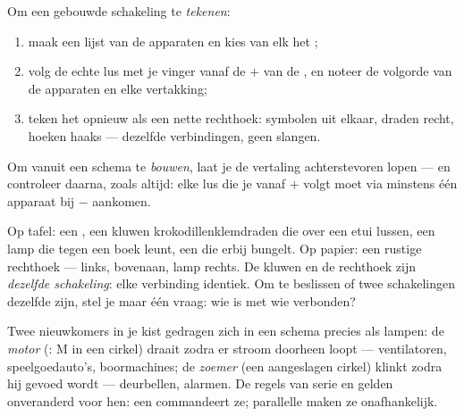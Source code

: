 \begin{method}\label{met:g6:circuits-and-safety:translate}
Om een gebouwde schakeling te \emph{tekenen}:
\begin{enumerate}
  \item maak een lijst van de apparaten en kies van elk het
        ;
  \item volg de echte lus met je vinger vanaf de $+$ van de
        , en noteer de volgorde van de apparaten en elke
        vertakking;
  \item teken het opnieuw als een nette rechthoek: symbolen uit
        elkaar, draden recht, hoeken haaks --- dezelfde
        verbindingen, geen slangen.
\end{enumerate}
Om vanuit een schema te \emph{bouwen}, laat je de vertaling
achterstevoren lopen --- en controleer daarna, zoals altijd: elke lus
die je vanaf $+$ volgt moet via minstens één apparaat bij $-$
aankomen.
\end{method}

\begin{example}\label{ex:g6:circuits-and-safety:portraits}
Op tafel: een , een kluwen krokodillenklemdraden die over
een etui lussen, een lamp die tegen een boek leunt, een 
die erbij bungelt. Op papier: een rustige rechthoek --- 
links,  bovenaan, lamp rechts. De kluwen en de rechthoek
zijn \emph{dezelfde schakeling}: elke verbinding identiek. Om te
beslissen of twee schakelingen dezelfde zijn, stel je maar één vraag:
wie is met wie verbonden?
\end{example}

\begin{example}\label{ex:g6:circuits-and-safety:motor}
Twee nieuwkomers in je kist gedragen zich in een schema precies als
lampen: de \emph{motor} (: M in een cirkel)
draait zodra er stroom doorheen loopt --- ventilatoren, speelgoedauto's,
boormachines; de \emph{zoemer} (een aangeslagen cirkel)
klinkt zodra hij gevoed wordt --- deurbellen, alarmen. De regels van
serie en  gelden onveranderd voor hen: een 
 commandeert ze; parallelle  maken ze
onafhankelijk.
\end{example}

